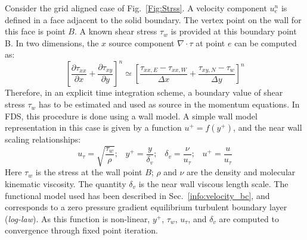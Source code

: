 Consider the grid aligned case of Fig.~\ref{Fig:Strss}. A velocity component $u_e^n$ is defined in a face adjacent to the solid boundary. 
The vertex point on the wall for this face is point $B$. A known shear stress $\tau_w$ is provided at this boundary point B. In two dimensions, the $x$ source component $\nabla \cdot \tau$ at point $e$ can be computed as:
%
\begin{equation}
   \left[ \frac{\partial \tau_{xx}}{\partial x} + \frac{\partial \tau_{xy}}{\partial y} \right]^n \simeq 
   \left[ \frac{\tau_{xx,E}-\tau_{xx,W}}{\Delta x} + \frac{\tau_{xy,N}-\tau_w}{\Delta y}   \right]^n
\end{equation}
%
Therefore, in an explicit time integration scheme, a boundary value of shear stress $\tau_w$ has to be estimated and used as source in the momentum equations. In FDS, this procedure is done using a wall model.
A simple wall model representation in this case is given by a function $u^+ = f(y^+)$, and the near wall scaling relationships:
%
\begin{equation}
  u_\tau = \sqrt{\frac{\tau_w}{\rho}}; \; \; \; y^+ = \frac{ y}{\delta_v}; \; \; \; \delta_v = \frac{\nu}{u_\tau}; \; \; \; u^+ = \frac{u}{u_\tau}
\end{equation}
%
Here $\tau_w$ is the stress at the wall point $B$; $\rho$ and $\nu$ are the density and molecular kinematic viscosity. The quantity $\delta_v$ is the near wall viscous length scale. The functional model used has been described in Sec.~\ref{info:velocity_bc}, and corresponds to a zero pressure gradient equilibrium turbulent boundary layer (\textit{log-law}). As this function is non-linear, $y^+$, $\tau_w$, $u_\tau$, and $\delta_v$ are computed to convergence through fixed point iteration. 

